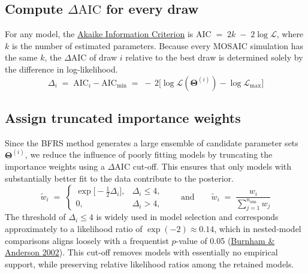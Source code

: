 \documentclass[
]{book}
\begin{document}
\subsection{\texorpdfstring{Compute \(\Delta \text{AIC}\) for every draw}{Compute \textbackslash Delta \textbackslash text\{AIC\} for every draw}}\label{compute-delta-textaic-for-every-draw}

For any model, the \href{https://en.wikipedia.org/wiki/Akaike_information_criterion}{Akaike Information Criterion} is \(\text{AIC} \;=\; 2k \;-\; 2\log\mathcal{L}\), where \(k\) is the number of estimated parameters. Because every MOSAIC simulation has the same \(k\), the \(\Delta \text{AIC}\) of draw \(i\) relative to the best draw is determined solely by the difference in log-likelihood.
\begin{equation}
\Delta_i
\;=\;
\text{AIC}_i - \text{AIC}_{\text{min}}
\;=\;
-\,2\!\bigl[\log\mathcal{L}(\boldsymbol{\Theta}^{(i)}) -
            \log\mathcal{L}_{\max}\bigr]
\label{eq:aic-delta}
\end{equation}

\subsection{Assign truncated importance weights}\label{assign-truncated-importance-weights}

Since the BFRS method generates a large ensemble of candidate parameter sets \(\boldsymbol{\Theta}^{(i)}\), we reduce the influence of poorly fitting models by truncating the importance weights using a \(\Delta \text{AIC}\) cut-off. This ensures that only models with substantially better fit to the data contribute to the posterior.
\begin{equation}
\tilde{w}_i \;=\;
\begin{cases}
\exp\!\bigl[-\tfrac12 \Delta_i\bigr], & \Delta_i \le 4,\\[6pt]
0, & \Delta_i > 4,
\end{cases}
\qquad \text{and} \qquad
\tilde{w}_i \;=\;
\dfrac{w_i}{\displaystyle\sum_{j=1}^{n_{\text{sim}}} w_j}
\label{eq:aic-weights}
\end{equation}
The threshold of \(\Delta_i \le 4\) is widely used in model selection and corresponds approximately to a likelihood ratio of \(\exp(-2) \approx 0.14\), which in nested-model comparisons aligns loosely with a frequentist \(p\)-value of 0.05 (\href{https://doi.org/10.1007/b97636}{Burnham \& Anderson 2002}). This cut-off removes models with essentially no empirical support, while preserving relative likelihood ratios among the retained models.
\end{document}
